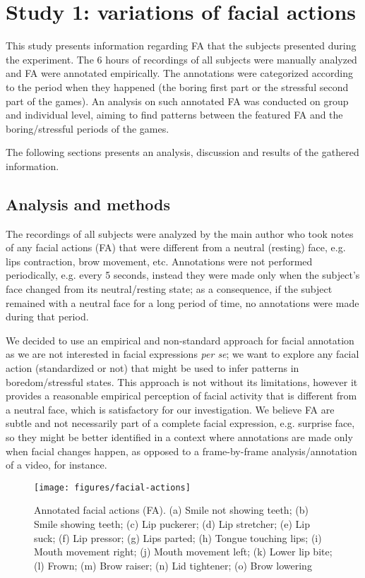 \section{Study 1: variations of facial actions}

This study presents information regarding FA that the subjects presented during the experiment. The 6 hours of recordings of all subjects were manually analyzed and FA were annotated empirically. The annotations were categorized according to the period when they happened (the boring first part or the stressful second part of the games). An analysis on such annotated FA was conducted on group and individual level, aiming to find patterns between the featured FA and the boring/stressful periods of the games.

The following sections presents an analysis, discussion and results of the gathered information.

\subsection{Analysis and methods}

The recordings of all subjects were analyzed by the main author who took notes of any facial actions (FA) that were different from a neutral (resting) face, e.g. lips contraction, brow movement, etc. Annotations were not performed periodically, e.g. every 5 seconds, instead they were made only when the subject's face changed from its neutral/resting state; as a consequence, if the subject remained with a neutral face for a long period of time, no annotations were made during that period.

We decided to use an empirical and non-standard approach for facial annotation as we are not interested in facial expressions \textit{per se}; we want to explore any facial action (standardized or not) that might be used to infer patterns in boredom/stressful states. This approach is not without its limitations, however it provides a reasonable empirical perception of facial activity that is different from a neutral face, which is satisfactory for our investigation. We believe FA are subtle and not necessarily part of a complete facial expression, e.g. surprise face, so they might be better identified in a context where annotations are made only when facial changes happen, as opposed to a frame-by-frame analysis/annotation of a video, for instance.

\begin{figure}[!h]
\centering
\texttt{[image: figures/facial-actions]}
\caption{Annotated facial actions (FA). (a) Smile not showing teeth; (b) Smile showing teeth; (c) Lip puckerer; (d) Lip stretcher; (e) Lip suck; (f) Lip pressor; (g) Lips parted; (h) Tongue touching lips; (i) Mouth movement right; (j) Mouth movement left; (k) Lower lip bite; (l) Frown; (m) Brow raiser; (n) Lid tightener; (o) Brow lowering}
\label{fig:fa}
\end{figure}

